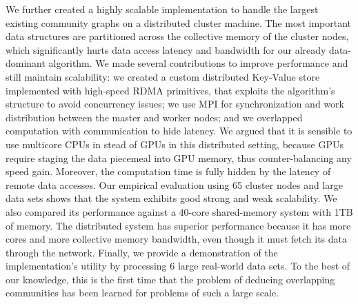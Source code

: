 We further created a highly scalable implementation to handle the largest existing
community graphs on a distributed cluster machine. The most important data structures
are partitioned across the collective memory of the cluster nodes, which
significantly hurts data access latency and bandwidth for our already data-dominant algorithm.
We made several contributions to improve performance and still maintain scalability:
we created a custom distributed Key-Value store implemented with high-speed RDMA
primitives, that exploits the algorithm's structure to avoid concurrency issues; we
use MPI for synchronization and work distribution between the master and worker nodes;
and
we overlapped computation
with communication to hide latency.
%
We argued that it is sensible to use multicore CPUs in stead of GPUs in this
distributed setting, because GPUs require staging the data piecemeal into GPU
memory, thus counter-balancing any speed gain. Moreover, the computation time is
fully hidden by the latency of remote data accesses.
%
Our empirical evaluation using 65 cluster nodes and large data sets
shows that the system exhibits good strong and weak scalability. We also compared its
performance against a 40-core shared-memory system with 1TB of memory.
The distributed system has superior performance because it has more cores and
more collective memory bandwidth, even though it must fetch its data through the network.
Finally, we provide a
demonstration of the implementation's utility by processing 6
large real-world data sets.
To the best of
our knowledge, this is the first time that the problem of deducing overlapping
communities has been learned for problems of such a large scale.
